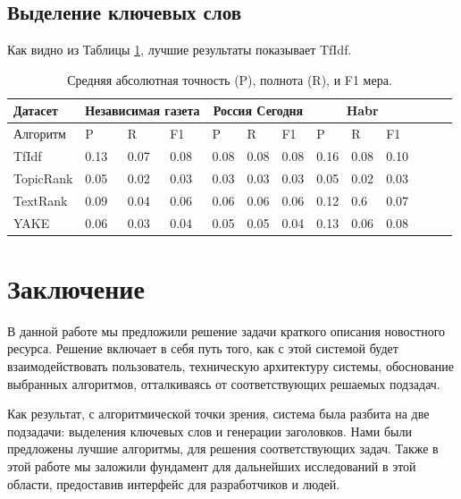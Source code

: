 \documentclass[14pt]{matmex-diploma-custom}
\begin{document}
\subsection{Выделение ключевых слов}

Как видно из Таблицы \ref{mae_mean_kw}, лучшие результаты показывает TfIdf.

\begin{table}[ht]
  \begin{center}
    \begin{tabular}{l|lll|lll|lll|lll}
      \hline
      Датасет   &  \multicolumn{3}{|c|}{Независимая газета}      & \multicolumn{3}{|c|}{Россия Сегодня}       & \multicolumn{3}{|c|}{Habr}          \\
      \hline
      Алгоритм  &          P &            R &         F1 &          P &              R &         F1 &          P &       R &         F1 \\
          TfIdf &       0.13 &         0.07 &       0.08 &       0.08 &           0.08 &       0.08 &       0.16 &    0.08 &       0.10 \\
      TopicRank &       0.05 &         0.02 &       0.03 &       0.03 &           0.03 &       0.03 &       0.05 &    0.02 &       0.03 \\
       TextRank &       0.09 &         0.04 &       0.06 &       0.06 &           0.06 &       0.06 &       0.12 &     0.6 &       0.07 \\
           YAKE &       0.06 &         0.03 &       0.04 &       0.05 &           0.05 &       0.04 &       0.13 &    0.06 &       0.08 \\
      \hline
    \end{tabular}
    \caption{
      \label{mae_mean_kw} Средняя абсолютная точность (P), полнота (R), и F1 мера.
    }
  \end{center}
\end{table}


\section*{Заключение}
В данной работе мы предложили решение задачи краткого описания новостного ресурса. Решение включает в себя путь того, как с этой системой будет взаимодействовать пользователь, техническую архитектуру системы, обоснование выбранных алгоритмов, отталкиваясь от соответствующих решаемых подзадач.

Как результат, с алгоритмической точки зрения, система была разбита на две подзадачи: выделения ключевых слов и генерации заголовков. Нами были предложены лучшие алгоритмы, для решения соответствующих задач. Также в этой работе мы заложили фундамент для дальнейших исследований в этой области, предоставив интерфейс для разработчиков и людей.

\setmonofont[Mapping=tex-text]{CMU Typewriter Text}


\end{document}
